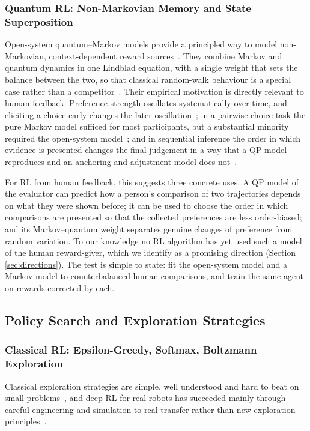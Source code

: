 \documentclass[pdflatex,sn-basic]{sn-jnl}
\begin{document}
\subsubsection{Quantum RL: Non-Markovian Memory and State Superposition}
Open-system quantum--Markov models provide a principled way to model non-Markovian, context-dependent reward sources~\citep{Busemeyer2020,Epping2023}. They combine Markov and quantum dynamics in one Lindblad equation, with a single weight that sets the balance between the two, so that classical random-walk behaviour is a special case rather than a competitor~\citep{Busemeyer2020}. Their empirical motivation is directly relevant to human feedback. Preference strength oscillates systematically over time, and eliciting a choice early changes the later oscillation~\citep{Kvam2021}; in a pairwise-choice task the pure Markov model sufficed for most participants, but a substantial minority required the open-system model~\citep{Epping2023}; and in sequential inference the order in which evidence is presented changes the final judgement in a way that a QP model reproduces and an anchoring-and-adjustment model does not~\citep{Trueblood2011}.

For RL from human feedback, this suggests three concrete uses. A QP model of the evaluator can predict how a person's comparison of two trajectories depends on what they were shown before; it can be used to choose the order in which comparisons are presented so that the collected preferences are less order-biased; and its Markov--quantum weight separates genuine changes of preference from random variation. To our knowledge no RL algorithm has yet used such a model of the human reward-giver, which we identify as a promising direction (Section \ref{sec:directions}). The test is simple to state: fit the open-system model and a Markov model to counterbalanced human comparisons, and train the same agent on rewards corrected by each.

\subsection{Policy Search and Exploration Strategies}\label{sec:vqcrl}

\subsubsection{Classical RL: Epsilon-Greedy, Softmax, Boltzmann Exploration}
Classical exploration strategies are simple, well understood and hard to beat on small problems~\citep{Sutton2018}, and deep RL for real robots has succeeded mainly through careful engineering and simulation-to-real transfer rather than new exploration principles~\citep{Lauri2023}.
\end{document}
